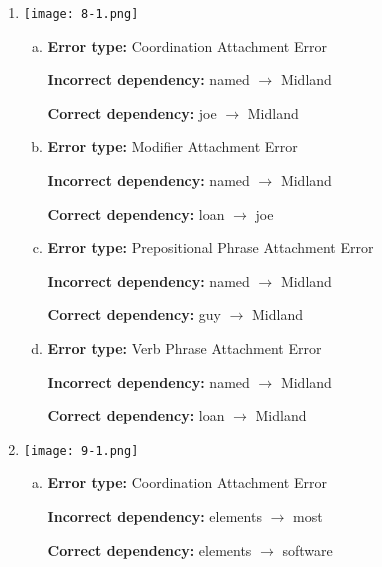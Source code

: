 \begin{enumerate}[1.]

\item {}

\begin{center}
\texttt{[image: 8-1.png]}
\end{center}

\begin{enumerate}[(a)]
\item {\bf Error type:} Coordination Attachment Error

{\bf Incorrect dependency:} named $\rightarrow$ Midland 

{\bf Correct dependency:} joe $\rightarrow$ Midland

\item {\bf Error type:} Modifier Attachment Error

{\bf Incorrect dependency:} named $\rightarrow$ Midland

{\bf Correct dependency:} loan $\rightarrow$ joe

\item {\bf Error type:} Prepositional Phrase Attachment Error 

{\bf Incorrect dependency:} named $\rightarrow$ Midland 

{\bf Correct dependency:} guy $\rightarrow$ Midland

\item {\bf Error type:} Verb Phrase Attachment Error

{\bf Incorrect dependency:} named $\rightarrow$ Midland

{\bf Correct dependency:} loan $\rightarrow$ Midland

\end{enumerate}


\item {}

\begin{center}
\texttt{[image: 9-1.png]}
\end{center}

\begin{enumerate}[(a)]
\item {\bf Error type:} Coordination Attachment Error

{\bf Incorrect dependency:} elements $\rightarrow$ most 

{\bf Correct dependency:} elements $\rightarrow$ software


\end{enumerate}
\end{enumerate}
